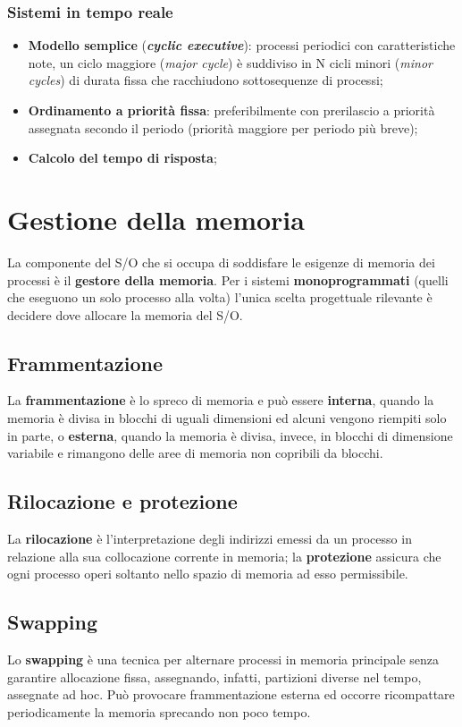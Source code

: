 \documentclass{article}
\begin{document}
\subsubsection{Sistemi in tempo reale} \begin{itemize}
    \item \textbf{Modello semplice} (\textbf{\textit{cyclic executive}}): processi periodici con caratteristiche note, un ciclo maggiore (\textit{major cycle}) è suddiviso in N cicli minori (\textit{minor cycles}) di durata fissa che racchiudono sottosequenze di processi;
    \item \textbf{Ordinamento a priorità fissa}: preferibilmente con prerilascio a priorità assegnata secondo il periodo (priorità maggiore per periodo più breve); %
    \item \textbf{Calcolo del tempo di risposta};
\end{itemize}

\section{Gestione della memoria} La componente del S/O che si occupa di soddisfare le esigenze di memoria dei processi è il \textbf{gestore della memoria}. Per i sistemi \textbf{monoprogrammati} (quelli che eseguono un solo processo alla volta) l'unica scelta progettuale rilevante è decidere dove allocare la memoria del S/O.

\subsection{Frammentazione} La \textbf{frammentazione} è lo spreco di memoria e può essere \textbf{interna}, quando la memoria è divisa in blocchi di uguali dimensioni ed alcuni vengono riempiti solo in parte, o \textbf{esterna}, quando la memoria è divisa, invece, in blocchi di dimensione variabile e rimangono delle aree di memoria non copribili da blocchi.

\subsection{Rilocazione e protezione} La \textbf{rilocazione} è l'interpretazione degli indirizzi emessi da un processo in relazione alla sua collocazione corrente in memoria; la \textbf{protezione} assicura che ogni processo operi soltanto nello spazio di memoria ad esso permissibile.

\subsection{Swapping} Lo \textbf{swapping} è una tecnica per alternare processi in memoria principale senza garantire allocazione fissa, assegnando, infatti, partizioni diverse nel tempo, assegnate ad hoc. Può provocare frammentazione esterna ed occorre ricompattare periodicamente la memoria sprecando non poco tempo.
\end{document}

